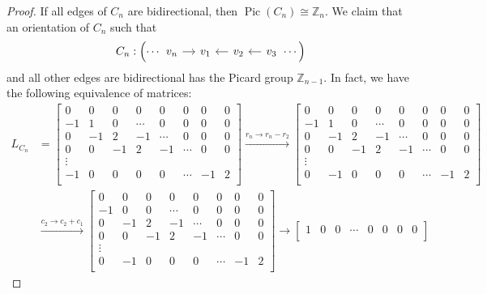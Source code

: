 \documentclass[11pt,reqno]{amsart}
\DeclareMathOperator{\Pic}{Pic}
\newcommand{\Z}{\mathbb{Z}}
\theoremstyle{definition}
\theoremstyle{plain}
\begin{document}
		\begin{proof}
If all edges of $C_n$ are bidirectional, then $\Pic (C_n) \cong \Z_n$. We claim that an orientation of $C_n$ such that 
			\[
			C_n: \left( \cdots \begin{tikzcd}[column sep=0.4cm]
				v_n \arrow[r] & v_1 & v_2 \arrow[l] & v_3 \arrow[l]
			\end{tikzcd} \cdots \right)
			\]
and all other edges are bidirectional has the Picard group $\mathbb{Z}_{n-1}$. In fact, we have the following equivalence of matrices:
			\begin{align}
			L_{C_n} &= \begin{bmatrix}
				0 & 0 & 0 & 0 & 0 & 0 & 0 & 0   \\
				-1 & 1 & 0 & \cdots & 0 & 0 & 0 & 0  \\
				0 & -1 & 2 & -1 & \cdots & 0 & 0 & 0 \\
				0 & 0 & -1 & 2 & -1 & \cdots & 0 & 0  \\
				\vdots \\
				-1 & 0 & 0 & 0 & 0 & \cdots & -1 & 2 \\
			\end{bmatrix}
			\stackrel{r_{n} \to r_{n} - r_{2}}\longrightarrow
			\begin{bmatrix}
				0 & 0 & 0 & 0 & 0 & 0 & 0 & 0   \\
				-1 & 1 & 0 & \cdots & 0 & 0 & 0 & 0  \\
				0 & -1 & 2 & -1 & \cdots & 0 & 0 & 0 \\
				0 & 0 & -1 & 2 & -1 & \cdots & 0 & 0  \\
				\vdots \\
				0 & -1 & 0 & 0 & 0 & \cdots & -1 & 2 \\
			\end{bmatrix}\\
			&\stackrel{c_2 \to c_2+c_1}\longrightarrow
			\begin{bmatrix}
				0 & 0 & 0 & 0 & 0 & 0 & 0 & 0   \\
				-1 & 0 & 0 & \cdots & 0 & 0 & 0 & 0 \\
				0 & -1 & 2 & -1 & \cdots & 0 & 0 & 0 \\
				0 & 0 & -1 & 2 & -1 & \cdots & 0 & 0  \\
				\vdots \\
				0 & -1 & 0 & 0 & 0 & \cdots & -1 & 2 \\
			\end{bmatrix}
			\to
			\begin{bmatrix}
				1 & 0 & 0 & \cdots & 0 & 0 & 0 & 0 \\

\end{bmatrix}
\end{align}
\end{proof}
\end{document}
